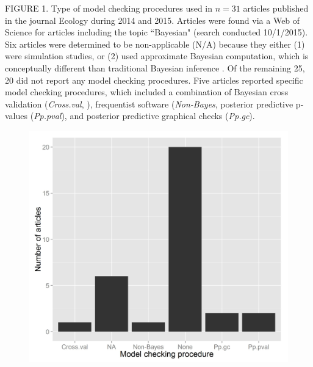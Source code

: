 \documentclass[12pt,english]{article}
\begin{document}
\begin{spacing}{1.9}
FIGURE 1.  Type of model checking procedures used in $n=31$ articles published in the journal Ecology during 2014 and 2015. Articles were found via a Web of Science for articles including the topic ``Bayesian" (search conducted 10/1/2015).  Six articles were determined to be non-applicable (N/A) because they either (1) were simulation studies, or (2) used approximate Bayesian computation, which is conceptually different than traditional Bayesian inference \citep[see e.g.][]{BeaumontEtAl2002}.  Of the remaining 25, 20 did not report any model checking procedures.  Five articles reported specific model checking procedures, which included a combination of Bayesian cross validation (\textit{Cross.val}, ), frequentist software (\textit{Non-Bayes}, posterior predictive p-values (\textit{Pp.pval}), and posterior predictive graphical checks (\textit{Pp.gc}).


\pagebreak

\begin{figure}
\begin{center}
\includegraphics[width=170mm]{WOSsearch.jpeg}
\caption{} \label{fig:WOS}
\end{center}
\end{figure}

\end{spacing}
\end{document}
